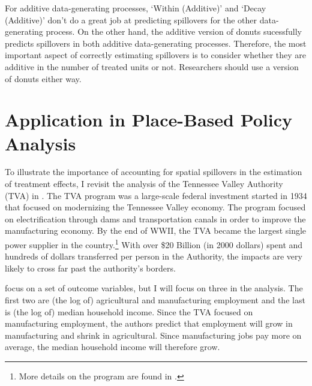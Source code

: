\documentclass[11pt]{article}
\begin{document}
For additive data-generating processes, `Within (Additive)' and `Decay (Additive)' don't do a great job at predicting spillovers for the other data-generating process. On the other hand, the additive version of donuts sucessfully predicts spillovers in both additive data-generating processes.  Therefore, the most important aspect of correctly estimating spillovers is to consider whether they are additive in the number of treated units or not. Researchers should use a version of donuts either way. 





\section{Application in Place-Based Policy Analysis}
\label{sec:tva}

To illustrate the importance of accounting for spatial spillovers in the estimation of treatment effects, I revisit the analysis of the Tennessee Valley Authority (TVA) in \citet{Kline_Moretti_2014}. The TVA program was a large-scale federal investment started in 1934 that focused on modernizing the Tennessee Valley economy. The program focused on electrification through dams and transportation canals in order to improve the manufacturing economy. By the end of WWII, the TVA became the largest single power supplier in the country.\footnote{More details on the program are found in \citet{Kline_Moretti_2014}.} With over \$20 Billion (in 2000 dollars) spent and hundreds of dollars transferred per person in the Authority, the impacts are very likely to cross far past the authority's borders. 

\citet{Kline_Moretti_2014} focus on a set of outcome variables, but I will focus on three in the analysis. The first two are (the log of) agricultural and manufacturing employment and the last is (the log of) median household income. Since the TVA focused on manufacturing employment, the authors predict that employment will grow in manufacturing and shrink in agricultural. Since manufacturing jobs pay more on average, the median household income will therefore grow. 
\end{document}
